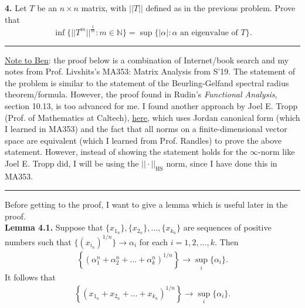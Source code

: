 \documentclass[11pt]{article}
\begin{document}
\newpage


\noindent \textbf{4.} Let $T$ be an $n \times n$ matrix,  with $||T||$ defined as in the previous problem.   Prove that
$$ \inf \{  || T^m || ^\frac{1}{m} : m \in \mathbb{N} \} = \sup \{ |\alpha| : \alpha \mbox{ an eigenvalue of } T \}. $$

\hrule
$\,$\\
\noindent \underline{Note to Ben}: the proof below is a combination of Internet/book search and my notes from Prof. Livshits's MA353: Matrix Analysis from S'19. The statement of the problem is similar to the statement of the Beurling-Gelfand spectral radius theorem/formula. However, the proof found in Rudin's \textit{Functional Analysis}, section 10.13, is too advanced for me. I found another approach by Joel E. Tropp (Prof. of Mathematics at Caltech),  \href{https://pdfs.semanticscholar.org/0bb8/67b2a2cc8e2711bc3273e21db5acdbc06e4d.pdf}{\underline{here}}, which uses Jordan canonical form (which I learned in MA353) and the fact that all norms on a finite-dimensional vector space are equivalent (which I learned from Prof. Randles) to prove the above statement. However, instead of showing the statement holds for the $\infty$-norm like Joel E. Tropp did, I will be using the $||\cdot||_{\text{HS}}$ norm, since I have done this in MA353.  \\  

\hrule
$\,$\\




\noindent Before getting to the proof, I want to give a lemma which is useful later in the proof.\\


\noindent \textbf{Lemma 4.1.} Suppose that $\{x_{1_n} \}, \{x_{2_n}\}, \dots, \{x_{k_n}\}$ are sequences of positive numbers such that $ \{(x_{i_n})^{1/n}\} \to \alpha_i$ for each $i=1,2,\dots,k$. Then 
\begin{align*}
\left\{ (\alpha_1^n+ \alpha_2^n+ \dots + \alpha_k^n)^{1/n} \right\} \to \sup_{i}\{\alpha_i\}.
\end{align*} 
It follows that
\begin{align*}
\left\{ (x_{1_n}+ x_{2_n}+ \dots + x_{k_n})^{1/n} \right\} \to \sup_{i}\{\alpha_i \}.
\end{align*}
 
\end{document}
